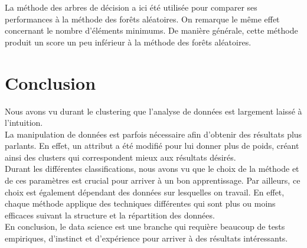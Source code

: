 \documentclass[11pt, a4paper]{article}
\begin{document}
La méthode des arbres de décision a ici été utilisée pour comparer ses performances à la méthode des forêts aléatoires.
On remarque le même effet concernant le nombre d'éléments minimums.
De manière générale, cette méthode produit un score un peu inférieur à la méthode des forêts aléatoires.

\newpage

\section{Conclusion}

Nous avons vu durant le clustering que l'analyse de données est largement laissé à l'intuition. \\
La manipulation de données est parfois nécessaire afin d'obtenir des résultats plus parlants.
En effet, un attribut a été modifié pour lui donner plus de poids,
créant ainsi des clusters qui correspondent mieux aux résultats désirés. \\

Durant les différentes classifications,
nous avons vu que le choix de la méthode et de ces paramètres est crucial pour arriver à un bon apprentissage.
Par ailleurs, ce choix est également dépendant des données sur lesquelles on travail.
En effet, chaque méthode applique des techniques différentes qui sont plus ou moins efficaces suivant
la structure et la répartition des données. \\

En conclusion, le data science est une branche qui requière beaucoup de tests empiriques,
d'instinct et d'expérience pour arriver à des résultats intéressants.
\end{document}

